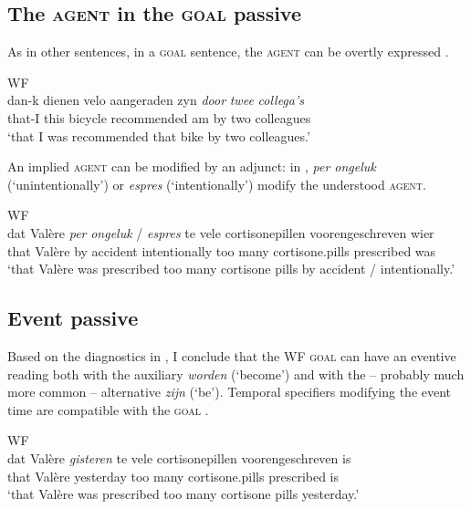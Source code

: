 \documentclass[output=paper]{langsci/langscibook}
\begin{document}
\subsection{The \textsc{agent} in the \textsc{goal}
passive}\label{sec:04.2.3}

As in other  sentences, in a \textsc{goal}  sentence, the
\textsc{agent} can be overtly expressed .

\ea%
    \label{ex:04.18}\glsdesc{WF}\\
    \gll dan-k    dienen velo   aangeraden   zyn   \textit{door} \textit{twee} \textit{collega's}\\
    that-I   this bicycle   recommended am   by   two   colleagues\\
    \glt ‘that I was recommended that bike by two colleagues.’
\z

An implied \textsc{agent} can be modified by an adjunct: in ,
\emph{per ongeluk} (‘unintentionally’) or \emph{espres} (‘intentionally’)
modify the understood \textsc{agent}.

\ea%
    \label{ex:04.19}\glsdesc{WF}\\
    \gll dat   Valère    \textit{per} \textit{ongeluk} / \textit{espres} te vele  cortisonepillen   voorengeschreven   wier\\
    that   Valère    by   accident {} intentionally too   many   cortisone.pills     prescribed     was\\
    \glt ‘that Valère was prescribed too many cortisone pills by accident /
    intentionally.’
\z

\subsection{Event passive}\label{sec:04.2.4}\largerpage %

Based on the diagnostics in
\textcite{BroekhuisCornips2004,BroekhuisCornips2012}, I conclude that the
\gls{WF} \textsc{goal}  can have an eventive
reading both with the auxiliary \emph{worden} (‘become’) and
with the -- probably much more common -- alternative \emph{zijn} (‘be’).
Temporal specifiers modifying the event time are compatible with the
\textsc{goal}  .

\ea%
    \label{ex:04.20}\glsdesc{WF}\\
    \gll    dat   Valère    \textit{gisteren} te   vele   cortisonepillen voorengeschreven   is\\
            that   Valère    yesterday too   many   cortisone.pills prescribed     is\\
    \glt    ‘that Valère was prescribed too many cortisone pills yesterday.’
\z
\end{document}
